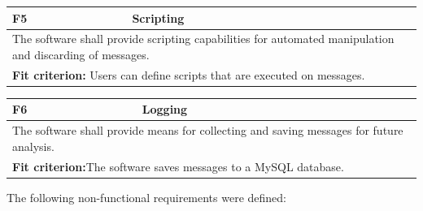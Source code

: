 \begin{center}

    \begin{tabular}{|p{1cm}|p{12cm}|}
        \hline
        \textbf{F5} & \textbf{Scripting}                                                                                                     \\ \hline
        \multicolumn{2}{|p{12cm}|}{The software shall provide scripting capabilities for automated manipulation and discarding of messages.} \\ \hline
        \multicolumn{2}{|p{12cm}|}{\textbf{Fit criterion:} Users can define scripts that are executed on messages.}                          \\ \hline
    \end{tabular}
\end{center}
\begin{center}
    \begin{tabular}{|p{1cm}|p{12cm}|}
        \hline
        \textbf{F6} & \textbf{Logging}                                                                                       \\ \hline
        \multicolumn{2}{|p{12cm}|}{The software shall provide means for collecting and saving messages for future analysis.} \\ \hline
        \multicolumn{2}{|p{12cm}|}{\textbf{Fit criterion:}The software saves messages to a MySQL database.}                  \\ \hline
    \end{tabular}
\end{center}
The following non-functional requirements were defined:


